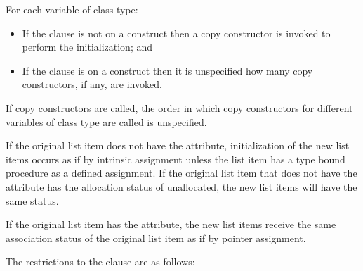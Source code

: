 \begin{cppspecific}
For each variable of class type:

\begin{itemize}
\item If the  clause is not on a  construct then 
      a copy constructor is invoked to perform the initialization; and
\item If the  clause is on a  construct then it 
      is unspecified how many copy constructors, if any, are invoked.
\end{itemize}

If copy constructors are called, the order in which copy constructors for different 
variables of class type are called is unspecified.
\end{cppspecific}

\begin{fortranspecific}
If the original list item does not have the  attribute,
initialization of the new list items occurs as if by intrinsic
assignment unless the list item has a type bound procedure as a
defined assignment.  If the original list item that does not have the
 attribute has the allocation status of unallocated, the
new list items will have the same status.

If the original list item has the  attribute, the new list 
items receive the same association status of the original list item as if 
by pointer assignment.
\end{fortranspecific}

\restrictions
The restrictions to the  clause are as follows:

